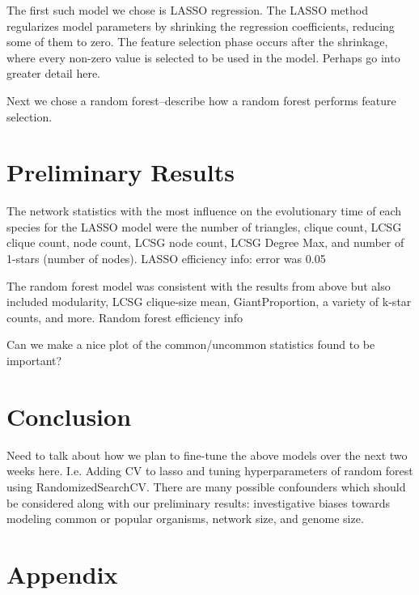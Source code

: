 \documentclass[12pt]{article}
\begin{document}
The first such model we chose is LASSO regression. The LASSO method regularizes model parameters by shrinking the regression coefficients, reducing some of them to zero. The feature selection phase occurs after the shrinkage, where every non-zero value is selected to be used in the model. Perhaps go into greater detail here.

Next we chose a random forest--describe how a random forest performs feature selection. 

\section{Preliminary Results}
The network statistics with the most influence on the evolutionary time of each species for the LASSO model were the number of triangles, clique count, LCSG clique count, node count, LCSG node count, LCSG Degree Max, and number of 1-stars (number of nodes). 
LASSO efficiency info: error was 0.05

The random forest model was consistent with the results from above but also included modularity, LCSG clique-size mean, GiantProportion, a variety of k-star counts, and more. 
Random forest efficiency info

Can we make a nice plot of the common/uncommon statistics found to be important?
\section{Conclusion}
Need to talk about how we plan to fine-tune the above models over the next two weeks here. I.e. Adding CV to lasso and tuning hyperparameters of random forest using RandomizedSearchCV. There are many possible confounders which should be considered along with our preliminary results: investigative biases towards modeling common or popular organisms, network size, and genome size.  \newpage
\section{Appendix}
\end{document}
